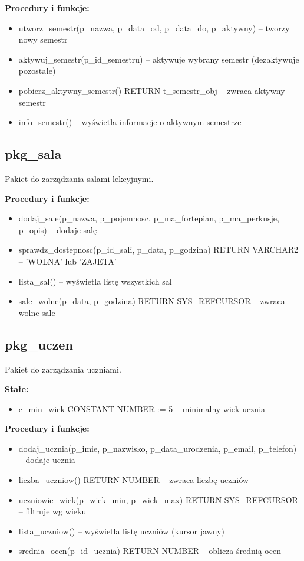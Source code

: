 \documentclass[12pt,a4paper]{article}
\begin{document}
\textbf{Procedury i funkcje:}
\begin{itemize}[nosep]
    \item utworz\_semestr(p\_nazwa, p\_data\_od, p\_data\_do, p\_aktywny) -- tworzy nowy semestr
    \item aktywuj\_semestr(p\_id\_semestru) -- aktywuje wybrany semestr (dezaktywuje pozostałe)
    \item pobierz\_aktywny\_semestr() RETURN t\_semestr\_obj -- zwraca aktywny semestr
    \item info\_semestr() -- wyświetla informacje o aktywnym semestrze
\end{itemize}

\subsection{pkg\_sala}
Pakiet do zarządzania salami lekcyjnymi.

\textbf{Procedury i funkcje:}
\begin{itemize}[nosep]
    \item dodaj\_sale(p\_nazwa, p\_pojemnosc, p\_ma\_fortepian, p\_ma\_perkusje, p\_opis) -- dodaje salę
    \item sprawdz\_dostepnosc(p\_id\_sali, p\_data, p\_godzina) RETURN VARCHAR2 -- 'WOLNA' lub 'ZAJETA'
    \item lista\_sal() -- wyświetla listę wszystkich sal
    \item sale\_wolne(p\_data, p\_godzina) RETURN SYS\_REFCURSOR -- zwraca wolne sale
\end{itemize}

\subsection{pkg\_uczen}
Pakiet do zarządzania uczniami.

\textbf{Stałe:}
\begin{itemize}[nosep]
    \item c\_min\_wiek CONSTANT NUMBER := 5 -- minimalny wiek ucznia
\end{itemize}

\textbf{Procedury i funkcje:}
\begin{itemize}[nosep]
    \item dodaj\_ucznia(p\_imie, p\_nazwisko, p\_data\_urodzenia, p\_email, p\_telefon) -- dodaje ucznia
    \item liczba\_uczniow() RETURN NUMBER -- zwraca liczbę uczniów
    \item uczniowie\_wiek(p\_wiek\_min, p\_wiek\_max) RETURN SYS\_REFCURSOR -- filtruje wg wieku
    \item lista\_uczniow() -- wyświetla listę uczniów (kursor jawny)
    \item srednia\_ocen(p\_id\_ucznia) RETURN NUMBER -- oblicza średnią ocen
\end{itemize}
\end{document}
